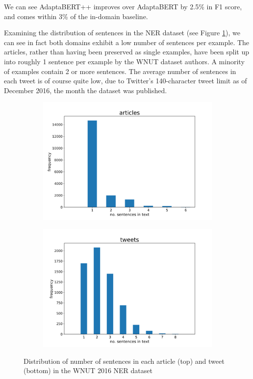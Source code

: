 We can see AdaptaBERT++ improves over AdaptaBERT by 2.5\% in F1 score, and comes within 3\% of the in-domain baseline.

Examining the distribution of sentences in the NER dataset (see Figure \ref{fig:ner-num-sentences-distributions}), we can see in fact both domains exhibit a low number of sentences per example. The articles, rather than having been preserved as single examples, have been split up into roughly 1 sentence per example by the WNUT dataset authors. A minority of examples contain 2 or more sentences. The average number of sentences in each tweet is of course quite low, due to Twitter's 140-character tweet limit as of December 2016, the month the dataset was published.

\begin{figure}[ht]
    \centering
    \begin{subfigure}{\textwidth}
        \centering
        \includegraphics[scale=0.45]{0-img/ner-num-sentences-distribution-articles.png}
    \end{subfigure}
    \begin{subfigure}{\textwidth}
        \centering
        \includegraphics[scale=0.45]{0-img/ner-num-sentences-distribution-tweets.png}
    \end{subfigure}
    \caption{Distribution of number of sentences in each article (top) and tweet (bottom) in the WNUT 2016 NER dataset}
    \label{fig:ner-num-sentences-distributions}
\end{figure}


